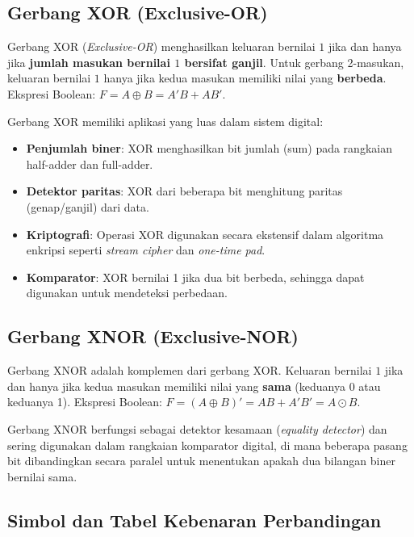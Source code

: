 \subsection{Gerbang XOR (Exclusive-OR)}

\begin{definisi}
Gerbang XOR (\textit{Exclusive-OR}) menghasilkan keluaran bernilai $1$ jika dan hanya jika \textbf{jumlah masukan bernilai $1$ bersifat ganjil}. Untuk gerbang 2-masukan, keluaran bernilai $1$ hanya jika kedua masukan memiliki nilai yang \textbf{berbeda}. Ekspresi Boolean: $F = A \oplus B = A'B + AB'$.
\end{definisi}

Gerbang XOR memiliki aplikasi yang luas dalam sistem digital:
\begin{itemize}
    \item \textbf{Penjumlah biner}: XOR menghasilkan bit jumlah (sum) pada rangkaian half-adder dan full-adder.
    \item \textbf{Detektor paritas}: XOR dari beberapa bit menghitung paritas (genap/ganjil) dari data.
    \item \textbf{Kriptografi}: Operasi XOR digunakan secara ekstensif dalam algoritma enkripsi seperti \textit{stream cipher} dan \textit{one-time pad}.
    \item \textbf{Komparator}: XOR bernilai 1 jika dua bit berbeda, sehingga dapat digunakan untuk mendeteksi perbedaan.
\end{itemize}

\subsection{Gerbang XNOR (Exclusive-NOR)}

\begin{definisi}
Gerbang XNOR adalah komplemen dari gerbang XOR. Keluaran bernilai $1$ jika dan hanya jika kedua masukan memiliki nilai yang \textbf{sama} (keduanya 0 atau keduanya 1). Ekspresi Boolean: $F = (A \oplus B)' = AB + A'B' = A \odot B$.
\end{definisi}

Gerbang XNOR berfungsi sebagai detektor kesamaan (\textit{equality detector}) dan sering digunakan dalam rangkaian komparator digital, di mana beberapa pasang bit dibandingkan secara paralel untuk menentukan apakah dua bilangan biner bernilai sama.

\subsection{Simbol dan Tabel Kebenaran Perbandingan}

